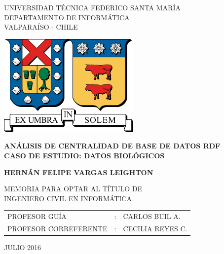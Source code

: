 
\begin{center}
  \begin{spacing}{1}
    {\large UNIVERSIDAD TÉCNICA FEDERICO SANTA MARÍA}\\
    DEPARTAMENTO DE INFORMÁTICA\\
    VALPARAÍSO - CHILE
  \end{spacing}

  \vspace{12mm}
  \includegraphics[height=50mm]{figures/utfsm.pdf}
  \vspace{15mm}

  \begin{spacing}{1.5} 
    \textbf{\large ANÁLISIS DE CENTRALIDAD DE BASE DE DATOS RDF }\\
    \textbf{\large CASO DE ESTUDIO: DATOS BIOLÓGICOS }\\
  \end{spacing}

  \vspace{20mm}
  \textbf{\large HERNÁN FELIPE VARGAS LEIGHTON}
  \vspace{12mm}

  \begin{spacing}{1.25} 
    MEMORIA PARA OPTAR AL TÍTULO DE\\
    INGENIERO CIVIL EN INFORMÁTICA
  \end{spacing}

  \vspace{15mm}
  \begin{table}[h]
    \begin{center}
      \begin{tabular}{ l c l }
        PROFESOR GUÍA & : & CARLOS BUIL A.\\
        PROFESOR CORREFERENTE & : & CECILIA REYES C.\\
      \end{tabular}
    \end{center}
  \end{table}

  \vfill
  \large JULIO 2016
\end{center}
